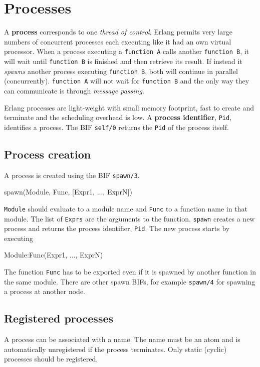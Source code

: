 \chapter{Processes}
\label{processes}

A \textbf{process} corresponds to one \textit{thread of
  control}. Erlang permits very large numbers of concurrent processes
each executing like it had an own virtual processor. When a process
executing a \texttt{function A} calls another \texttt{function B}, it
will wait until \texttt{function B} is finished and then retrieve its
result. If instead it \textit{spawns} another process executing
\texttt{function B}, both will continue in parallel
(concurrently). \texttt{function A} will not wait for \texttt{function
  B} and the only way they can communicate is through \textit{message
  passing}.

Erlang processes are light-weight with small memory footprint, fast to
create and terminate and the scheduling overhead is low. A
\textbf{process identifier}, \texttt{Pid}, identifies a process. The
BIF \texttt{self/0} returns the \texttt{Pid} of the process itself.


\section{Process creation}
A process is created using the BIF \texttt{spawn/3}.

\begin{erlang}
spawn(Module, Func, [Expr1, ..., ExprN])
\end{erlang}

\texttt{Module} should evaluate to a module name and \texttt{Func} to
a function name in that module. The list of \texttt{Exprs} are the
arguments to the function. \texttt{spawn} creates a new process and
returns the process identifier, \texttt{Pid}. The new process starts
by executing

\begin{erlang}
Module:Func(Expr1, ..., ExprN)
\end{erlang}

The function \texttt{Func} has to be exported even if it is spawned by
another function in the same module. There are other spawn BIFs, for
example \texttt{spawn/4} for spawning a process at another node.


\section{Registered processes}
A process can be associated with a name. The name must be an atom and
is automatically unregistered if the process terminates. Only static
(cyclic) processes should be registered.

